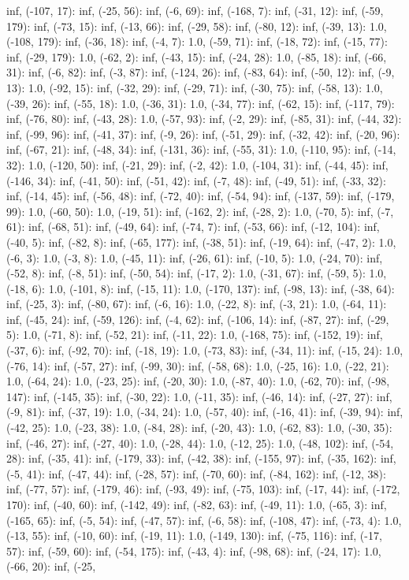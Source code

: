 \documentclass[parskip=half]{scrartcl}
\begin{document}
inf, (-107, 17): inf, (-25, 56): inf, (-6, 69): inf, (-168, 7): inf, (-31, 12): inf, (-59, 179): inf, (-73, 15): inf, (-13, 66): inf, (-29, 58): inf, (-80, 12): inf, (-39, 13): 1.0, (-108, 179): inf, (-36, 18): inf, (-4, 7): 1.0, (-59, 71): inf, (-18, 72): inf, (-15, 77): inf, (-29, 179): 1.0, (-62, 2): inf, (-43, 15): inf, (-24, 28): 1.0, (-85, 18): inf, (-66, 31): inf, (-6, 82): inf, (-3, 87): inf, (-124, 26): inf, (-83, 64): inf, (-50, 12): inf, (-9, 13): 1.0, (-92, 15): inf, (-32, 29): inf, (-29, 71): inf, (-30, 75): inf, (-58, 13): 1.0, (-39, 26): inf, (-55, 18): 1.0, (-36, 31): 1.0, (-34, 77): inf, (-62, 15): inf, (-117, 79): inf, (-76, 80): inf, (-43, 28): 1.0, (-57, 93): inf, (-2, 29): inf, (-85, 31): inf, (-44, 32): inf, (-99, 96): inf, (-41, 37): inf, (-9, 26): inf, (-51, 29): inf, (-32, 42): inf, (-20, 96): inf, (-67, 21): inf, (-48, 34): inf, (-131, 36): inf, (-55, 31): 1.0, (-110, 95): inf, (-14, 32): 1.0, (-120, 50): inf, (-21, 29): inf, (-2, 42): 1.0, (-104, 31): inf, (-44, 45): inf, (-146, 34): inf, (-41, 50): inf, (-51, 42): inf, (-7, 48): inf, (-49, 51): inf, (-33, 32): inf, (-14, 45): inf, (-56, 48): inf, (-72, 40): inf, (-54, 94): inf, (-137, 59): inf, (-179, 99): 1.0, (-60, 50): 1.0, (-19, 51): inf, (-162, 2): inf, (-28, 2): 1.0, (-70, 5): inf, (-7, 61): inf, (-68, 51): inf, (-49, 64): inf, (-74, 7): inf, (-53, 66): inf, (-12, 104): inf, (-40, 5): inf, (-82, 8): inf, (-65, 177): inf, (-38, 51): inf, (-19, 64): inf, (-47, 2): 1.0, (-6, 3): 1.0, (-3, 8): 1.0, (-45, 11): inf, (-26, 61): inf, (-10, 5): 1.0, (-24, 70): inf, (-52, 8): inf, (-8, 51): inf, (-50, 54): inf, (-17, 2): 1.0, (-31, 67): inf, (-59, 5): 1.0, (-18, 6): 1.0, (-101, 8): inf, (-15, 11): 1.0, (-170, 137): inf, (-98, 13): inf, (-38, 64): inf, (-25, 3): inf, (-80, 67): inf, (-6, 16): 1.0, (-22, 8): inf, (-3, 21): 1.0, (-64, 11): inf, (-45, 24): inf, (-59, 126): inf, (-4, 62): inf, (-106, 14): inf, (-87, 27): inf, (-29, 5): 1.0, (-71, 8): inf, (-52, 21): inf, (-11, 22): 1.0, (-168, 75): inf, (-152, 19): inf, (-37, 6): inf, (-92, 70): inf, (-18, 19): 1.0, (-73, 83): inf, (-34, 11): inf, (-15, 24): 1.0, (-76, 14): inf, (-57, 27): inf, (-99, 30): inf, (-58, 68): 1.0, (-25, 16): 1.0, (-22, 21): 1.0, (-64, 24): 1.0, (-23, 25): inf, (-20, 30): 1.0, (-87, 40): 1.0, (-62, 70): inf, (-98, 147): inf, (-145, 35): inf, (-30, 22): 1.0, (-11, 35): inf, (-46, 14): inf, (-27, 27): inf, (-9, 81): inf, (-37, 19): 1.0, (-34, 24): 1.0, (-57, 40): inf, (-16, 41): inf, (-39, 94): inf, (-42, 25): 1.0, (-23, 38): 1.0, (-84, 28): inf, (-20, 43): 1.0, (-62, 83): 1.0, (-30, 35): inf, (-46, 27): inf, (-27, 40): 1.0, (-28, 44): 1.0, (-12, 25): 1.0, (-48, 102): inf, (-54, 28): inf, (-35, 41): inf, (-179, 33): inf, (-42, 38): inf, (-155, 97): inf, (-35, 162): inf, (-5, 41): inf, (-47, 44): inf, (-28, 57): inf, (-70, 60): inf, (-84, 162): inf, (-12, 38): inf, (-77, 57): inf, (-179, 46): inf, (-93, 49): inf, (-75, 103): inf, (-17, 44): inf, (-172, 170): inf, (-40, 60): inf, (-142, 49): inf, (-82, 63): inf, (-49, 11): 1.0, (-65, 3): inf, (-165, 65): inf, (-5, 54): inf, (-47, 57): inf, (-6, 58): inf, (-108, 47): inf, (-73, 4): 1.0, (-13, 55): inf, (-10, 60): inf, (-19, 11): 1.0, (-149, 130): inf, (-75, 116): inf, (-17, 57): inf, (-59, 60): inf, (-54, 175): inf, (-43, 4): inf, (-98, 68): inf, (-24, 17): 1.0, (-66, 20): inf, (-25, 
\end{document}
